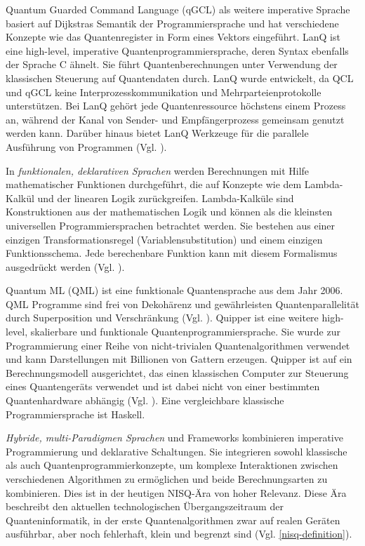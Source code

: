 Quantum Guarded Command Language (qGCL) als weitere imperative Sprache basiert auf Dijkstras Semantik der Programmiersprache und hat verschiedene Konzepte wie das Quantenregister in Form eines Vektors eingeführt. LanQ ist eine high-level, imperative Quantenprogrammiersprache, deren Syntax ebenfalls der Sprache C ähnelt. Sie führt Quantenberechnungen unter Verwendung der klassischen Steuerung auf Quantendaten durch. LanQ wurde entwickelt, da QCL und qGCL keine Interprozesskommunikation und Mehrparteienprotokolle unterstützen. Bei LanQ gehört jede Quantenressource höchstens einem Prozess an, während der Kanal von Sender- und Empfängerprozess gemeinsam genutzt werden kann. Darüber hinaus bietet LanQ Werkzeuge für die parallele Ausführung von Programmen (Vgl. \cite{garhwal_quantum_2021}).

In \textit{funktionalen, deklarativen Sprachen} werden Berechnungen mit Hilfe mathematischer Funktionen durchgeführt, die auf Konzepte wie dem Lambda-Kalkül und der linearen Logik zurückgreifen. Lambda-Kalküle sind Konstruktionen aus der mathematischen Logik und können als die kleinsten universellen Programmiersprachen betrachtet werden. Sie bestehen aus einer einzigen Transformationsregel (Variablensubstitution) und einem einzigen Funktionsschema. Jede berechenbare Funktion kann mit diesem Formalismus ausgedrückt werden (Vgl. \cite{garhwal_quantum_2021}).

Quantum ML (QML) ist eine funktionale Quantensprache aus dem Jahr 2006. QML Programme sind frei von Dekohärenz und gewährleisten Quantenparallelität durch Superposition und Verschränkung (Vgl. \cite{garhwal_quantum_2021}). 
Quipper ist eine weitere high-level, skalierbare und funktionale Quantenprogrammiersprache. Sie wurde zur Programmierung einer Reihe von nicht-trivialen Quantenalgorithmen verwendet und kann Darstellungen mit Billionen von Gattern erzeugen. Quipper ist auf ein Berechnungsmodell ausgerichtet, das einen klassischen Computer zur Steuerung eines Quantengeräts verwendet und ist dabei nicht von einer bestimmten Quantenhardware abhängig (Vgl. \cite{green_quipper_2013}). Eine vergleichbare klassische Programmiersprache ist Haskell.

\textit{Hybride, multi-Paradigmen Sprachen} und Frameworks kombinieren imperative Programmierung und deklarative Schaltungen. Sie integrieren sowohl klassische als auch Quantenprogrammierkonzepte, um komplexe Interaktionen zwischen verschiedenen Algorithmen zu ermöglichen und beide Berechnungsarten zu kombinieren. Dies ist in der heutigen NISQ-Ära von hoher Relevanz. Diese Ära beschreibt den aktuellen technologischen Übergangszeitraum der Quanteninformatik, in der erste Quantenalgorithmen zwar auf realen Geräten ausführbar, aber noch fehlerhaft, klein und begrenzt sind (Vgl. \ref{nisq-definition}). 

